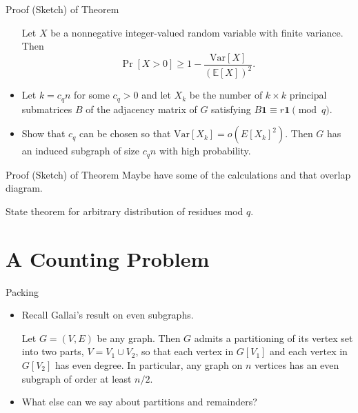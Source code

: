 \documentclass{beamer}
\theoremstyle{plain}
\newcommand{\E}{\mathbb{E}}
\newcommand{\Var}{\text{Var}}
\begin{document}
	\begin{frame}{Proof (Sketch) of Theorem}
		\begin{itemize}
			\begin{theorem}
				Let $X$ be a nonnegative integer-valued random variable with finite variance.
				Then
				\[
					\Pr[X > 0] \geq 1 - \frac{\Var[X]}{(\E[X])^2}.
				\]

			\end{theorem}

			\pause

			\item Let $k = c_qn$ for some $c_q>0$ and let $X_k$ be the number of $k\times k$ principal submatrices $B$ of the adjacency matrix of $G$ satisfying $B\boldsymbol{1} \equiv r\boldsymbol{1} \pmod {q}$.

			\pause

			\item Show that $c_q$ can be chosen so that $\Var[X_k] = o(E[X_k]^2)$.
			Then $G$ has an induced subgraph of size $c_qn$ with high probability.
		\end{itemize}
	\end{frame}


	\begin{frame}{Proof (Sketch) of Theorem}
		Maybe have some of the calculations and that overlap diagram.	
	\end{frame}


	\begin{frame}
		State theorem for arbitrary distribution of residues mod $q$.	
	\end{frame}


\section{A Counting Problem}

	\begin{frame}{Packing}
		\begin{itemize}
			\item Recall Gallai's result on even subgraphs.
			\begin{theorem}
				Let $G = (V, E)$ be any graph.
				Then $G$ admits a partitioning of its vertex set into two parts, $V = V_1 \cup V_2$, so that each vertex in $G[V_1]$ and each vertex in $G[V_2]$ has even degree.
				In particular, any graph on $n$ vertices has an even subgraph of order at least $n/2$.
			\end{theorem}\pause

			\item What else can we say about partitions and remainders?
		\end{itemize}
	\end{frame}
\end{document}
